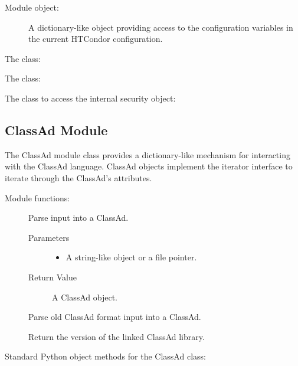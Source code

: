 Module object:
\begin{description}
  \item[]
  A dictionary-like object providing access to the configuration variables
  in the current HTCondor configuration.
\end{description}

The  class:
\Todo

The  class:
\Todo

The class to access the internal security object:
\Todo

\subsection{\label{Python-ClassAd} ClassAd Module}

The ClassAd module class provides a dictionary-like mechanism for interacting
with the ClassAd language. 
ClassAd objects implement the iterator interface to iterate 
through the ClassAd's attributes.

Module functions:

\begin{description}
\item []
  Parse input into a ClassAd.

  \begin{description}
    \item[ Parameters]
    \begin{itemize}
      \item {} A string-like object or a file pointer. 
    \end{itemize}
    \item[ Return Value]
      A ClassAd object.
  \end{description}  

\item []
  Parse old ClassAd format input into a ClassAd.

\item []
  Return the version of the linked ClassAd library.
\end{description}

Standard Python object methods for the ClassAd class:

